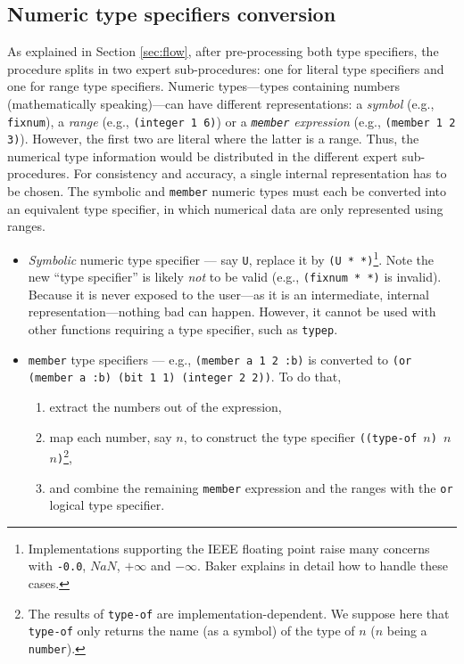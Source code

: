 \documentclass[format=sigconf]{acmart}
\newcommand\code[2][\small]{\sloppy\texttt{#1#2}}
\newcommand\footcode[1]{\code[\scriptsize]{#1}}
\theoremstyle{definition}
\begin{document}
\subsection{Numeric type specifiers conversion}
\label{sec:numconv}
As explained in Section \ref{sec:flow}, after pre-processing both type
specifiers, the procedure splits in two expert sub-procedures: one for literal
type specifiers and one for range type specifiers.
Numeric types---types containing numbers (mathematically speaking)---can have
different representations: a \emph{symbol} (e.g., \code{fixnum}), a \emph{range}
(e.g., \code{(integer 1 6)}) or a \emph{\code{member} expression}
(e.g., \code{(member 1 2 3)}). However, the first two are literal where the
latter is a range. Thus, the numerical type information would be distributed in
the different expert sub-procedures. For consistency and accuracy, a single internal
representation has to be chosen. The symbolic and \code{member} numeric types
must each be converted into an equivalent type specifier, in which numerical
data are only represented using ranges.

\begin{itemize}
\item \emph{Symbolic} numeric type specifier --- say \code{U}, replace it by
  \code{(U * *)}\footnote{%
    Implementations supporting the IEEE floating point
    raise many concerns with \footcode{-0.0}, $NaN$, $+\infty$ and $-\infty$.
    Baker explains in detail how to handle these cases.%
  }. Note the new ``type specifier'' is likely
  \emph{not} to be valid (e.g., \code{(fixnum * *)} is invalid). Because it is
  never exposed to the user---as it is an intermediate, internal
  representation---nothing bad can happen. However, it cannot be used with other
  functions requiring a type specifier, such as \code{typep}.
\item \code{member} type specifiers --- e.g., \code{(member a 1 2 :b)} is
  converted to \code{(or (member a :b) (bit 1 1) (integer 2 2))}.
  To do that,
  \begin{enumerate}
  \item extract the numbers out of the expression,
  \item map each number, say $n$, to construct the type specifier
    \code{((type-of $n$) $n$ $n$)}\footnote{%
      The results of \footcode{type-of} are implementation-dependent. We suppose
      here that \footcode{type-of} only returns the name (as a symbol) of the
      type of $n$ ($n$ being a \footcode{number}).
    },
  \item and combine the remaining \code{member} expression and the ranges with
    the \code{or} logical type specifier.
  \end{enumerate}
\end{itemize}
\end{document}
